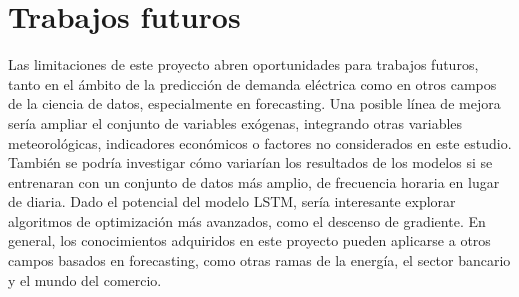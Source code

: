 \documentclass[12pt,a4paper]{report}
\begin{document}
\section{Trabajos futuros}

Las limitaciones de este proyecto abren oportunidades para trabajos futuros, tanto en el ámbito de la predicción de demanda eléctrica como en otros campos de la ciencia de datos, especialmente en forecasting. Una posible línea de mejora sería ampliar el conjunto de variables exógenas, integrando otras variables meteorológicas, indicadores económicos o factores no considerados en este estudio. También se podría investigar cómo variarían los resultados de los modelos si se entrenaran con un conjunto de datos más amplio, de frecuencia horaria en lugar de diaria. Dado el potencial del modelo LSTM, sería interesante explorar algoritmos de optimización más avanzados, como el descenso de gradiente. En general, los conocimientos adquiridos en este proyecto pueden aplicarse a otros campos basados en forecasting, como otras ramas de la energía, el sector bancario y el mundo del comercio.

\appendix
\printbibliography
{} 
\end{document}
